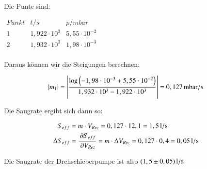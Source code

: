 Die Punte sind:

\begin{center}
	$
	\begin{matrix}
	Punkt	& t/s & p/mbar \\ 
	1	& 1,922 \cdot 10^{3} & 5,55 \cdot 10^{-2} \\ 
	2	& 1,932 \cdot 10^{3} & 1,98 \cdot 10^{-3} \\ 
	
	\end{matrix} 
	$	
\end{center}


Daraus können wir die Steigungen berechnen:

\begin{align*}
|m_1| &= \left| \frac{\log \left( -1,98 \cdot 10^{-3} + 5,55 \cdot 10^{-2} \right)}{1,932 \cdot 10^{3} - 1,922 \cdot 10^{3}} \right| = \unit[0,127]{mbar/s} \\
\end{align*}

Die Saugrate ergibt sich dann so:

\begin{align*}
S_{eff} &= m \cdot V_{Rez} = 0,127 \cdot 12,1 = \unit[1,5]{l/s} \\
\Delta S_{eff} &= \frac{\p S_{eff}}{\p V_{Rez}} = m \cdot \Delta V_{Rez} = 0,127 \cdot 0,4 = \unit[0,05]{l/s}
\end{align*}


Die Saugrate der Drehschieberpumpe ist also $\unit[(1,5 \pm 0,05)]{l/s}$













